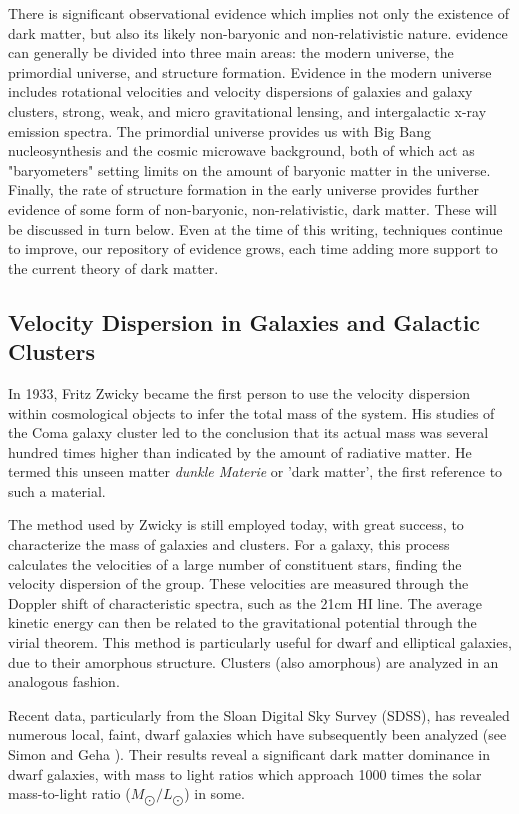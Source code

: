 \documentclass{report}
\begin{document}
There is significant observational evidence which implies not only the existence of dark matter, but also its likely non-baryonic and non-relativistic nature. evidence can generally be divided into three main areas: the modern universe, the primordial universe, and structure formation. Evidence in the modern universe includes rotational velocities and velocity dispersions of galaxies and galaxy clusters, strong, weak, and micro gravitational lensing, and intergalactic x-ray emission spectra. The primordial universe provides us with Big Bang nucleosynthesis and the cosmic microwave background, both of which act as "baryometers" setting limits on the amount of baryonic matter in the universe. Finally, the rate of structure formation in the early universe provides further evidence of some form of non-baryonic, non-relativistic, dark matter. These will be discussed in turn below. Even at the time of this writing, techniques continue to improve, our repository of evidence grows, each time adding more support to the current theory of dark matter.

\subsection{Velocity Dispersion in Galaxies and Galactic Clusters}

In 1933, Fritz Zwicky became the first person to use the velocity dispersion within cosmological objects to infer the total mass of the system. His studies of the Coma galaxy cluster led to the conclusion that its actual mass was several hundred times higher than indicated by the amount of radiative matter. He termed this unseen matter \emph{dunkle Materie} or 'dark matter', the first reference to such a material.

The method used by Zwicky is still employed today, with great success, to characterize the mass of galaxies and clusters. For a galaxy, this process calculates the velocities of a large number of constituent stars, finding the velocity dispersion of the group. These velocities are measured through the Doppler shift of characteristic spectra, such as the 21cm HI line. The average kinetic energy can then be related to the gravitational potential through the virial theorem. This method is particularly useful for dwarf and elliptical galaxies, due to their amorphous structure. Clusters (also amorphous) are analyzed in an analogous fashion.

Recent data, particularly from the Sloan Digital Sky Survey (SDSS), has revealed numerous local, faint, dwarf galaxies which have subsequently been analyzed (see Simon and Geha \cite{Simon2007}). Their results reveal a significant dark matter dominance in dwarf galaxies, with mass to light ratios which approach 1000 times the solar mass-to-light ratio ($M_{\bigodot}/L_{\bigodot}$) in some. %
\end{document}
